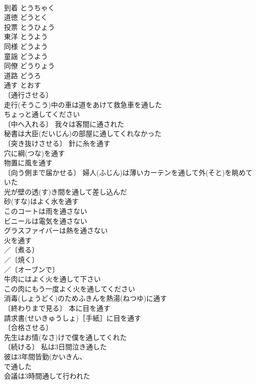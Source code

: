 \documentclass[8pt]{extreport}
\begin{document}
\begin{CJK}{UTF8}{min}
\\	到着	とうちゃく	
\\	道徳	どうとく	
\\	投票	とうひょう	
\\	東洋	とうよう	
\\	同様	どうよう	
\\	童謡	どうよう	
\\	同僚	どうりょう	
\\	道路	どうろ	
\\	通す	とおす	
\\	〔通行させる〕
\\	走行(そうこう)中の車は道をあけて救急車を通した 
\\	ちょっと通してください 
\\	〔中へ入れる〕 我々は客間に通された 
\\	秘書は大臣(だいじん)の部屋に通してくれなかった 
\\	〔突き抜けさせる〕 針に糸を通す 
\\	穴に綱(つな)を通す 
\\	物置に風を通す 
\\	〔向う側まで届かせる〕 婦人(ふじん)は薄いカーテンを通して外(そと)を眺めていた 
\\	光が壁の透(す)き間を通して差し込んだ 
\\	砂(すな)はよく水を通す 
\\	このコートは雨を通さない 
\\	ビニールは電気を通さない 
\\	グラスファイバーは熱を通さない 
\\	火を通す 
\\	／〔煮る〕
\\	／〔焼く〕
\\	／〔オーブンで〕
\\	牛肉にはよく火を通して下さい 
\\	この肉にもう一度よく火を通してください 
\\	消毒(しょうどく)のためふきんを熱湯(ねつゆ)に通す 
\\	〔終わりまで見る〕 本に目を通す 
\\	請求書(せいきゅうしょ)［手紙］に目を通す 
\\	〔合格させる〕
\\	先生はお情(なさ)けで僕を通してくれた 
\\	〔続ける〕 私は3日間泣き通した 
\\	彼は3年間皆勤(かいきん、
\\	で通した 
\\	会議は3時間通して行われた 

\end{CJK}
\end{document}
